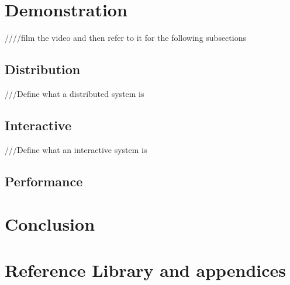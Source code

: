 \documentclass[8pt, a4paper]{article}
\begin{document}
\section{Demonstration}
////film the video and then refer to it for the following subsections


\subsection{Distribution}
///Define what a distributed system is 

\subsection{Interactive}
///Define what an interactive system is

\subsection{Performance}






\section{Conclusion}


\section{Reference Library and appendices}
\end{document}
